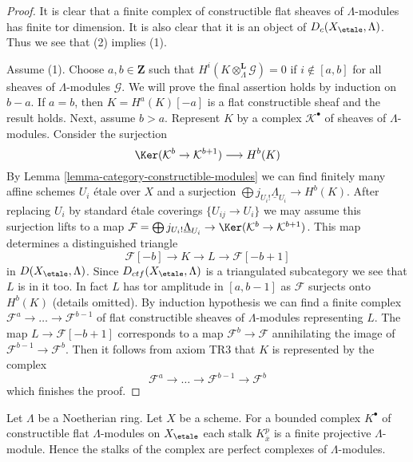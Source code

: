 \begin{proof}
It is clear that a finite complex of constructible
flat sheaves of $\Lambda$-modules has finite tor dimension.
It is also clear that it is an object of $D_c(X_\etale, \Lambda)$.
Thus we see that (2) implies (1).

\medskip\noindent
Assume (1). Choose $a, b \in \mathbf{Z}$ such that
$H^i(K \otimes_\Lambda^\mathbf{L} \mathcal{G}) = 0$ if
$i \not \in [a, b]$ for all sheaves of $\Lambda$-modules $\mathcal{G}$.
We will prove the final assertion holds by induction on $b - a$. If
$a = b$, then $K = H^a(K)[-a]$ is a flat constructible sheaf
and the result holds. Next, assume $b > a$. Represent $K$
by a complex $\mathcal{K}^\bullet$ of sheaves of $\Lambda$-modules.
Consider the surjection
$$
\Ker(\mathcal{K}^b \to \mathcal{K}^{b + 1})
\longrightarrow
H^b(K)
$$
By Lemma \ref{lemma-category-constructible-modules}
we can find finitely many affine schemes $U_i$ \'etale over $X$ and a
surjection $\bigoplus j_{U_i!}\underline{\Lambda}_{U_i} \to H^b(K)$.
After replacing $U_i$ by standard \'etale coverings $\{U_{ij} \to U_i\}$
we may assume this surjection lifts to a map
$\mathcal{F} = \bigoplus j_{U_i!}\underline{\Lambda}_{U_i} \to
\Ker(\mathcal{K}^b \to \mathcal{K}^{b + 1})$.
This map determines a distinguished triangle
$$
\mathcal{F}[-b] \to K \to L \to \mathcal{F}[-b + 1]
$$
in $D(X_\etale, \Lambda)$. Since $D_{ctf}(X_\etale, \Lambda)$ is a triangulated
subcategory we see that $L$ is in it too. In fact $L$ has
tor amplitude in $[a, b - 1]$ as $\mathcal{F}$ surjects onto
$H^b(K)$ (details omitted). By induction hypothesis we can find
a finite complex $\mathcal{F}^a \to \ldots \to \mathcal{F}^{b - 1}$
of flat constructible sheaves of $\Lambda$-modules representing $L$.
The map $L \to \mathcal{F}[-b + 1]$ corresponds to a map
$\mathcal{F}^b \to \mathcal{F}$ annihilating the image
of $\mathcal{F}^{b - 1} \to \mathcal{F}^b$. Then it follows
from axiom TR3 that $K$ is represented by the complex
$$
\mathcal{F}^a \to \ldots \to \mathcal{F}^{b - 1} \to \mathcal{F}^b
$$
which finishes the proof.
\end{proof}

\begin{remark}
\label{remark-projective-each-degree}
Let $\Lambda$ be a Noetherian ring. Let $X$ be a scheme.
For a bounded complex $K^\bullet$ of constructible flat $\Lambda$-modules
on $X_\etale$
each stalk $K^p_{\overline{x}}$ is a finite projective $\Lambda$-module.
Hence the stalks of the complex are perfect complexes of $\Lambda$-modules.
\end{remark}

